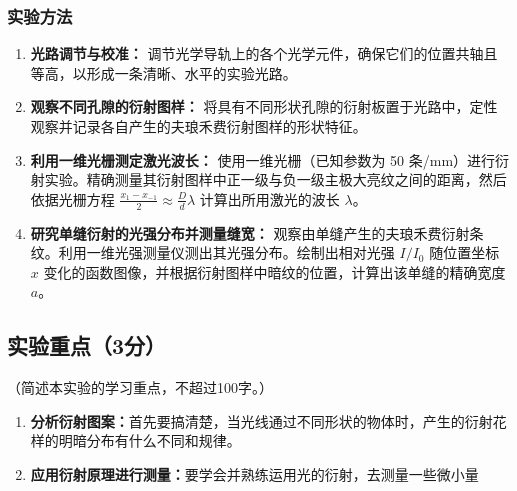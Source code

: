\documentclass[]{../template/Report}%
\begin{document}
\subsubsection{实验方法}
\begin{enumerate}
    \item \textbf{光路调节与校准：}
    调节光学导轨上的各个光学元件，确保它们的位置共轴且等高，以形成一条清晰、水平的实验光路。

    \item \textbf{观察不同孔隙的衍射图样：}
    将具有不同形状孔隙的衍射板置于光路中，定性观察并记录各自产生的夫琅禾费衍射图样的形状特征。

    \item \textbf{利用一维光栅测定激光波长：}
    使用一维光栅（已知参数为 50 条/\si{\mm}）进行衍射实验。精确测量其衍射图样中正一级与负一级主极大亮纹之间的距离，然后依据光栅方程 $\frac{x_1 - x_{-1}}{2} \approx \frac{D}{d}\lambda$ 计算出所用激光的波长 $\lambda$。

    \item \textbf{研究单缝衍射的光强分布并测量缝宽：}
    观察由单缝产生的夫琅禾费衍射条纹。利用一维光强测量仪测出其光强分布。绘制出相对光强 $I/I_0$ 随位置坐标 $x$ 变化的函数图像，并根据衍射图样中暗纹的位置，计算出该单缝的精确宽度 $a$。

\end{enumerate}
\subsection{实验重点（3分）}
（简述本实验的学习重点，不超过100字。）
\begin{enumerate}
    \item \textbf{分析衍射图案：}首先要搞清楚，当光线通过不同形状的物体时，产生的衍射花样的明暗分布有什么不同和规律。
    \item \textbf{应用衍射原理进行测量：}要学会并熟练运用光的衍射，去测量一些微小量
\end{enumerate}
\end{document}
